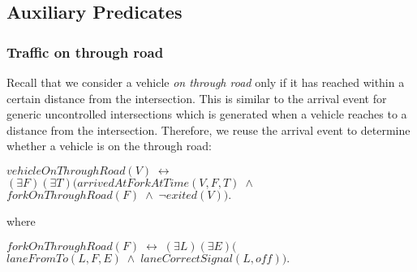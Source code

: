 \subsection{Auxiliary Predicates}

\subsubsection{Traffic on through road}
Recall that we consider a vehicle \emph{on through road}
only if it has reached within a certain distance from the intersection.
This is similar to the arrival event for generic uncontrolled intersections
which is generated when a vehicle reaches to a distance from the intersection.
Therefore,
we reuse the arrival event to determine whether a vehicle is on the through road:
\begin{center}
    $ vehicleOnThroughRoad(V) \; \leftrightarrow  $ \\
    $ (\exists F)(\exists T) \Big( arrivedAtForkAtTime(V, F, T) \; \land  $ \\
    $ forkOnThroughRoad(F) \; \land \; \neg exited(V) \Big). $
\end{center}
where
\begin{center}
    $ forkOnThroughRoad(F) \; \leftrightarrow \; (\exists L)(\exists E) \Big( $ \\
    $ laneFromTo(L, F, E) \; \land \; laneCorrectSignal(L, off)  \Big). $
\end{center}